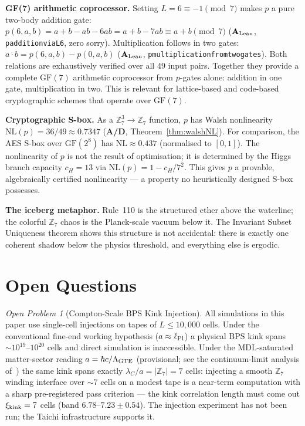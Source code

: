 \documentclass[11pt]{article}
\theoremstyle{remark}
\newtheorem{openprob}{Open Problem}
\newcommand{\ZS}{\ensuremath{\mathbb{Z}_7}}
\newcommand{\GF}[1]{\ensuremath{\mathrm{GF}(#1)}}
\newcommand{\lean}[1]{%
  \penalty-100
  \begingroup\def\_{\textunderscore\allowbreak}\texttt{#1}\endgroup}
\newcommand{\CatAL}{\texorpdfstring{\ensuremath{\textbf{A}_{\rm Lean}}}{A-Lean}}
\newcommand{\CatAD}{\textbf{A/D}}
\begin{document}
\medskip
\noindent\textbf{GF(7) arithmetic coprocessor.}
Setting $L = 6 \equiv -1 \pmod{7}$ makes $p$ a pure two-body addition gate:
$p(6,a,b) = a+b-ab-6ab = a+b-7ab \equiv a+b \pmod{7}$ (\CatAL{},
\lean{p\_addition\_via\_L6}, zero sorry).
Multiplication follows in two gates: $a \cdot b = p(6,a,b) - p(0,a,b)$
(\CatAL{}, \lean{p\_multiplication\_from\_two\_gates}).
Both relations are exhaustively verified over all 49 input pairs.
Together they provide a complete $\GF{7}$ arithmetic coprocessor from $p$-gates alone:
addition in one gate, multiplication in two.
This is relevant for lattice-based and code-based cryptographic schemes that operate over $\GF{7}$.

\medskip
\noindent\textbf{Cryptographic S-box.}
As a $\mathbb{Z}_7^3 \to \mathbb{Z}_7$ function, $p$ has Walsh nonlinearity
$\mathrm{NL}(p) = 36/49 \approx 0.7347$ (\CatAD{}, Theorem~\ref{thm:walshNL}).
For comparison, the AES S-box over $\GF{2^8}$ has $\mathrm{NL} \approx 0.437$
(normalised to $[0,1]$).
The nonlinearity of $p$ is not the result of optimisation; it is determined by the
Higgs branch capacity $c_H = 13$ via $\mathrm{NL}(p) = 1 - c_H/7^2$.
This gives $p$ a provable, algebraically certified nonlinearity --- a property no
heuristically designed S-box possesses.

\medskip
\noindent\textbf{The iceberg metaphor.}
Rule~110 is the structured ether above the waterline; the colorful $\ZS$ chaos
is the Planck-scale vacuum below it. The Invariant Subset Uniqueness theorem
shows this structure is not accidental: there is exactly one coherent shadow
below the physics threshold, and everything else is ergodic.

\section{Open Questions}
\label{sec:open}

\begin{openprob}[Compton-Scale BPS Kink Injection]
All simulations in this paper use single-cell injections on tapes of $L \leq
10{,}000$ cells. Under the conventional fine-end working hypothesis
($a \approx \ell_{\rm Pl}$) a physical BPS kink spans
${\sim}10^{19}$--$10^{20}$ cells and direct simulation is inaccessible.
Under the MDL-saturated matter-sector reading $a = \hbar c/\Lambda_{\rm
GTE}$ (provisional; see the continuum-limit analysis
of~\cite{SpivackSpin7Lattice}) the same kink spans exactly
$\lambda_C/a = |\ZS| = 7$ cells: injecting a smooth $\ZS$ winding
interface over ${\sim}7$ cells on a modest tape is a near-term computation
with a sharp pre-registered pass criterion --- the kink correlation length
must come out $\xi_{\rm kink} = 7$ cells (band
$6.78$--$7.23 \pm 0.54$). The injection experiment has not been run; the
Taichi infrastructure supports it.
\end{openprob}
\end{document}

